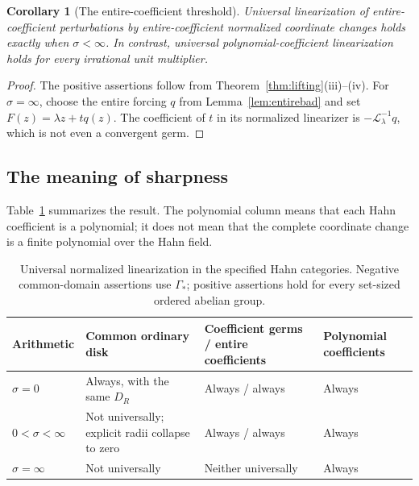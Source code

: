 \documentclass[11pt,a4paper]{article}
\numberwithin{equation}{section}
\newtheorem{corollary}[theorem]{Corollary}
\theoremstyle{definition}
\theoremstyle{remark}
\newcommand{\LL}{\mathcal L}
\newcommand{\Gstar}{\Gamma_*}
\begin{document}
\begin{corollary}[The entire-coefficient threshold]\label{cor:entirethreshold}
Universal linearization of entire-coefficient perturbations by
entire-coefficient normalized coordinate changes holds exactly when
$\sigma<\infty$. In contrast, universal polynomial-coefficient
linearization holds for every irrational unit multiplier.
\end{corollary}

\begin{proof}
The positive assertions follow from Theorem~\ref{thm:lifting}(iii)--(iv).
For $\sigma=\infty$, choose the entire forcing $q$ from
Lemma~\ref{lem:entirebad} and set $F(z)=\lambda z+tq(z)$.
The coefficient of $t$ in its normalized linearizer is
$-\LL_\lambda^{-1}q$, which is not even a convergent germ.
\end{proof}

\subsection{The meaning of sharpness}

Table~\ref{tab:trichotomy} summarizes the result. The polynomial column
means that each Hahn coefficient is a polynomial; it does not mean that
the complete coordinate change is a finite polynomial over the Hahn field.

\begin{table}[ht]
\centering\small
\begin{tabular}{@{}>{\raggedright\arraybackslash}p{}>{\raggedright\arraybackslash}p{}>{\raggedright\arraybackslash}p{}>{\raggedright\arraybackslash}p{}@{}}
\toprule
Arithmetic & Common ordinary disk & Coefficient germs / entire coefficients
& Polynomial coefficients\\
\midrule
$\sigma=0$ & Always, with the same $D_R$ & Always / always & Always\\[3pt]
$0<\sigma<\infty$ & Not universally; explicit radii collapse to zero
& Always / always & Always\\[3pt]
$\sigma=\infty$ & Not universally & Neither universally & Always\\
\bottomrule
\end{tabular}
\caption{Universal normalized linearization in the specified Hahn categories.
Negative common-domain assertions use $\Gstar$; positive assertions hold
for every set-sized ordered abelian group.}\label{tab:trichotomy}
\end{table}
\end{document}

